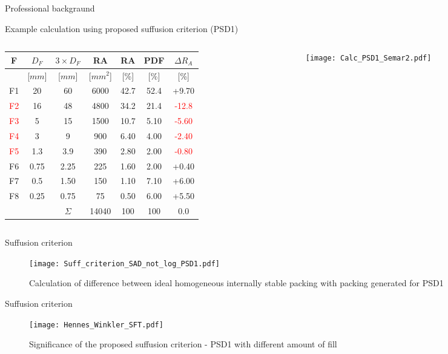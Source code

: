 \documentclass[10pt,xcolor=dvipsnames]{beamer}
\begin{document}
{\begin{frame}{Professional backgraund}
\begin{frame}{Example calculation using proposed suffusion criterion (PSD1)}
\begin{columns}
\begin{column}{0.68\textwidth}
{\scriptsize
\centering
\begin{tabular}{|c|c|c|c|c|c|c|}
\toprule
F & $D_{F}$  & $ 3 \times D_{F}$ & RA & RA & PDF & $\Delta R_{A}$ \\\hline
[-] & [$mm$] &  [$mm$] &  [$mm^{2}$] & [\%] & [\%] & [\%]\\\hline
F1 & 20  & 60  & 6000 & 42.7 & 52.4& +9.70 \\
\textcolor{red}{F2} & 16  & 48  & 4800 & 34.2 & 21.4& \textcolor{red}{-12.8} \\
\textcolor{red}{F3} & 5   & 15  & 1500 & 10.7 & 5.10& \textcolor{red}{-5.60} \\
\textcolor{red}{F4} & 3   & 9   & 900  & 6.40 & 4.00& \textcolor{red}{-2.40} \\
\textcolor{red}{F5} & 1.3 & 3.9 & 390  & 2.80 & 2.00& \textcolor{red}{-0.80} \\
F6 & 0.75& 2.25& 225  & 1.60 & 2.00& +0.40  \\
F7 & 0.5 & 1.50& 150  & 1.10 & 7.10& +6.00  \\
F8 & 0.25& 0.75& 75   & 0.50 & 6.00& +5.50  \\\hline
   & & $\Sigma$ & 14040   & 100  & 100 & 0.0 \\
   \bottomrule
\end{tabular}
}
\end{column}
\begin{column}{0.31\textwidth}
\texttt{[image: Calc\_PSD1\_Semar2.pdf]} 
\label{fig:areas_PSD1}
\end{column}
\end{columns}
\end{frame}



{
\usenavigationsymbolstemplate{}
\begin{frame}{Suffusion criterion}
\begin{figure}[H]
   \centering
\texttt{[image: Suff\_criterion\_SAD\_not\_log\_PSD1.pdf]} 
        \caption{Calculation of difference between ideal homogeneous internally stable packing with packing generated for PSD1}
        \label{fig:reserved_area_PSD1}
\end{figure}

	
\end{frame}
}
{
\usenavigationsymbolstemplate{}
\begin{frame}{Suffusion criterion}
\begin{figure}[H]
   \centering
\texttt{[image: Hennes\_Winkler\_SFT.pdf]} 
\vspace{-0.2cm}
        \caption{Significance of the proposed suffusion criterion - PSD1 with different amount of fill}
        \label{fig:reserved_area_PSD1}
\end{figure}


\end{frame}}
\end{frame}}
\end{document}
